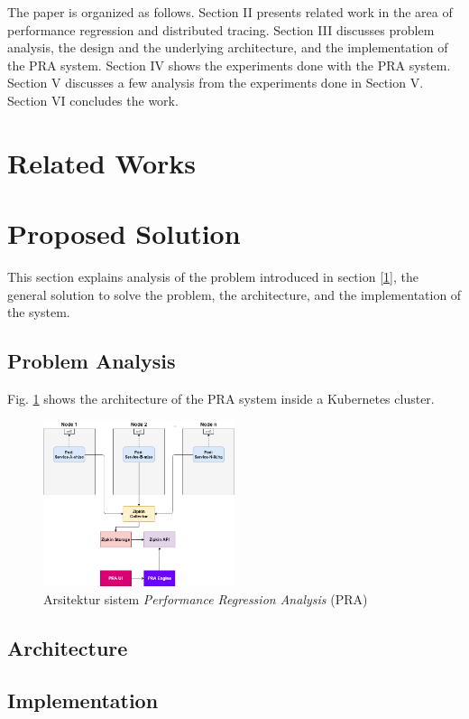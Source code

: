 \documentclass[conference]{configs/IEEEtran}
\begin{document}
The paper is organized as follows. Section II presents related
work in the area of performance regression and distributed tracing. Section III discusses problem analysis, the design and the underlying architecture, and the implementation of the PRA system. Section IV shows the experiments done with the PRA system. Section V discusses a few analysis from the experiments done in Section V. Section
VI concludes the work.


\section{Related Works}

\section{Proposed Solution}
This section explains analysis of the problem introduced in section \ref{1}, the general solution to solve the problem, the architecture, and the implementation of the system.

\subsection{Problem Analysis}
Fig. \ref{arch-pra} shows the architecture of the PRA system inside a Kubernetes cluster.
\begin{figure}[!htb]
	\centering
	\includegraphics[width=0.5\textwidth]{resources/ch3/arch.png}
	\caption{Arsitektur sistem \textit{Performance Regression Analysis} (PRA)}
	\label{arch-pra}
\end{figure}

\subsection{Architecture}

\subsection{Implementation}
\end{document}
